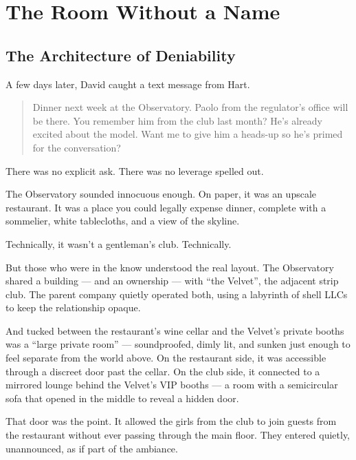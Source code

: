 \section{The Room Without a Name}

\subsection{The Architecture of Deniability}

A few days later, David caught a text message from Hart.

\begin{quote}
  Dinner next week at the Observatory. Paolo from the regulator’s office will be there. You remember him from the club 
  last month? He’s already excited about the model. Want me to give him a heads-up so he’s primed for the conversation?
\end{quote}

There was no explicit ask. There was no leverage spelled out.

The Observatory sounded innocuous enough. On paper, it was an upscale restaurant. It was a place you could legally expense 
dinner, complete with a sommelier, white tablecloths, and a view of the skyline.  

Technically, it wasn’t a gentleman’s club. Technically.

But those who were in the know understood the real layout. The Observatory shared a building --- and an ownership --- with 
``the Velvet'', the adjacent strip club. The parent company quietly operated both, using a labyrinth of shell 
LLCs to keep the relationship opaque.

And tucked between the restaurant’s wine cellar and the Velvet’s private booths was a “large private room” — soundproofed, 
dimly lit, and sunken just enough to feel separate from the world above. On the restaurant side, it was accessible through 
a discreet door past the cellar. On the club side, it connected to a mirrored lounge behind the Velvet’s VIP booths — a 
room with a semicircular sofa that opened in the middle to reveal a hidden door.

That door was the point. It allowed the girls from the club to join guests from the restaurant without ever passing through 
the main floor. They entered quietly, unannounced, as if part of the ambiance. 

\medskip

